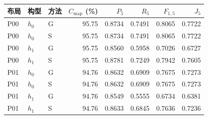 \begin{tabular}{lllrrrrr}
\toprule
布局 & 构型 & 方法 & $C_{\mathrm{map}}$ (\%) & $P_5$ & $R_5$ & $F_{1,5}$ & $J_5$\\\midrule
P00 & $h_0$ & G & 95.75 & 0.8734 & 0.7491 & 0.8065 & 0.7722 \\
P00 & $h_0$ & S & 95.75 & 0.8734 & 0.7491 & 0.8065 & 0.7722 \\
P00 & $h_1$ & G & 95.75 & 0.8560 & 0.5958 & 0.7026 & 0.6727 \\
P00 & $h_1$ & S & 95.75 & 0.8781 & 0.7249 & 0.7942 & 0.7605 \\
P01 & $h_0$ & G & 94.76 & 0.8632 & 0.6909 & 0.7675 & 0.7273 \\
P01 & $h_0$ & S & 94.76 & 0.8632 & 0.6909 & 0.7675 & 0.7273 \\
P01 & $h_1$ & G & 94.76 & 0.8549 & 0.5555 & 0.6734 & 0.6381 \\
P01 & $h_1$ & S & 94.76 & 0.8633 & 0.6845 & 0.7636 & 0.7236 \\
\bottomrule
\end{tabular}
